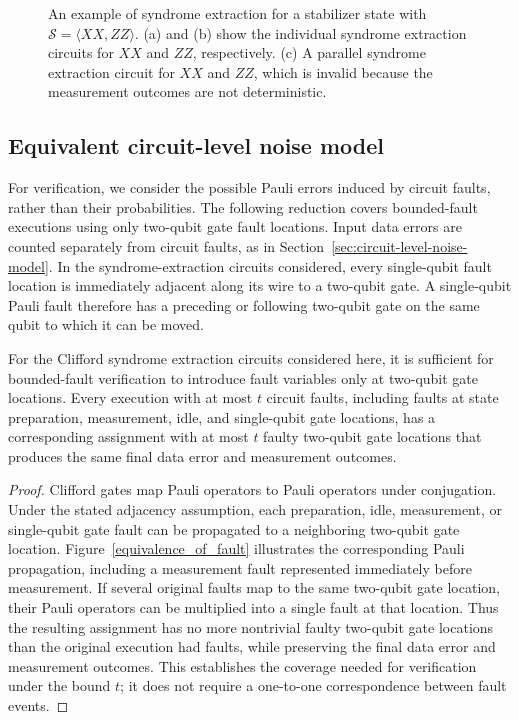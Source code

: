 \documentclass[acmsmall,screen,review,anonymous,nonacm]{acmart}
\begin{document}
\begin{figure}[h]
  \caption{An example of syndrome extraction for a stabilizer state with
$\mathcal{S}=\langle XX,ZZ\rangle$.
(a) and (b) show the individual syndrome extraction circuits for $XX$ and
$ZZ$, respectively. (c) A parallel syndrome extraction circuit for $XX$ and
$ZZ$, which is invalid because the measurement outcomes are not deterministic.}
    \label{fig:three-part-syndrome-bad}
\end{figure}


\subsection{Equivalent circuit-level noise model}

For verification, we consider the possible Pauli errors induced by circuit faults, rather than their probabilities. The following reduction covers bounded-fault executions using only two-qubit gate fault locations. Input data errors are counted separately from circuit faults, as in Section~\ref{sec:circuit-level-noise-model}. 
In the syndrome-extraction circuits considered, every single-qubit fault location is immediately adjacent along its wire to a two-qubit gate. A single-qubit Pauli fault therefore has a preceding or following two-qubit gate on the same qubit to which it can be moved.



\begin{proposition}
\label{prop}
For the Clifford syndrome extraction circuits considered here, it is sufficient for bounded-fault verification to introduce fault variables only at two-qubit gate locations. Every execution with at most $t$ circuit faults, including faults at state preparation, measurement, idle, and single-qubit gate locations, has a corresponding assignment with at most $t$ faulty two-qubit gate locations that produces the same final data error and measurement outcomes.
\end{proposition}


\begin{proof}

Clifford gates map Pauli operators to Pauli operators under conjugation.
Under the stated adjacency assumption, each preparation, idle,
measurement, or single-qubit gate fault can be propagated to a
neighboring two-qubit gate location. Figure~\ref{equivalence_of_fault}
illustrates the corresponding Pauli propagation, including a
measurement fault represented immediately before measurement.
If several original faults map to the same two-qubit gate location,
their Pauli operators can be multiplied into a single fault at that
location. Thus the resulting assignment has no more nontrivial faulty
two-qubit gate locations than the original execution had faults,
while preserving the final data error and measurement outcomes.
This establishes the coverage needed for verification under the bound
$t$; it does not require a one-to-one correspondence between fault events.
    
\end{proof}
\end{document}
